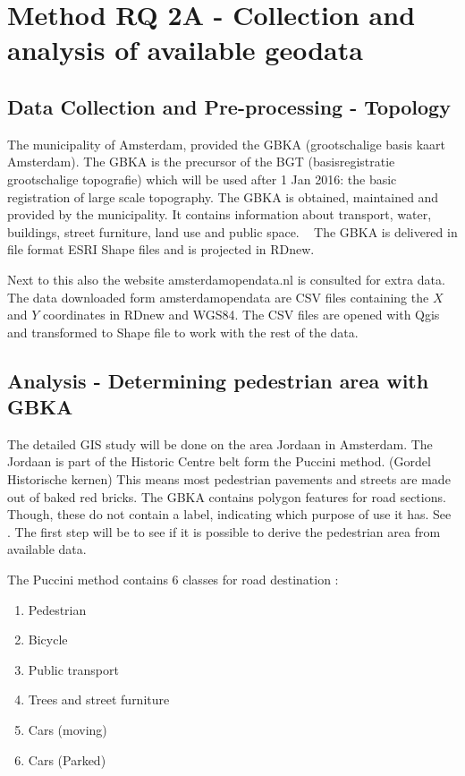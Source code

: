 \section{Method RQ 2A - Collection and analysis of available geodata}

\subsection{Data Collection and Pre-processing - Topology }
The municipality of Amsterdam, provided the GBKA (grootschalige basis kaart Amsterdam). The GBKA is the precursor of the BGT (basisregistratie grootschalige topografie) which will be used after 1 Jan 2016: the basic registration of large scale topography. The GBKA is obtained, maintained and provided by the municipality. It contains information about transport, water, buildings, street furniture, land use and public space. ~\cite{gbka} The GBKA is delivered in file format ESRI Shape files and is projected in RDnew. 

Next to this also the website amsterdamopendata.nl is consulted for extra data. ~\cite{opendata} The data downloaded form amsterdamopendata are CSV files containing the $X$ and $Y$ coordinates in RDnew and WGS84. The CSV files are opened with Qgis and transformed to Shape file to work with the rest of the data. 

\subsection{Analysis - Determining pedestrian area with GBKA}

The detailed GIS study will be done on the area Jordaan in Amsterdam. The Jordaan is part of the Historic Centre belt form the Puccini method. (Gordel Historische kernen) This means most pedestrian pavements and streets are made out of baked red bricks. \cite{puccini2014}
The GBKA contains polygon features for road sections. Though, these do not contain a label, indicating which purpose of use it has. See \cite{gbka}. The first step will be to see if it is possible to derive the pedestrian area from available data. 

The Puccini method contains 6 classes for road destination \cite{puccini2014}:

\begin{enumerate}
\item Pedestrian
\item Bicycle
\item Public transport
\item Trees and street furniture
\item Cars (moving)
\item Cars (Parked)
\end{enumerate}

